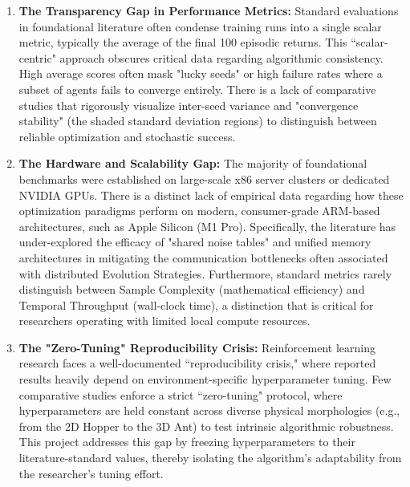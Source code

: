 \begin{enumerate}
    \item \textbf{The Transparency Gap in Performance Metrics:} Standard evaluations in foundational literature often condense training runs into a single scalar metric, typically the average of the final 100 episodic returns. This ``scalar-centric" approach obscures critical data regarding algorithmic consistency. High average scores often mask "lucky seeds" or high failure rates where a subset of agents fails to converge entirely. There is a lack of comparative studies that rigorously visualize inter-seed variance and "convergence stability" (the shaded standard deviation regions) to distinguish between reliable optimization and stochastic success.
    
    \item \textbf{The Hardware and Scalability Gap:} The majority of foundational benchmarks were established on large-scale x86 server clusters or dedicated NVIDIA GPUs. There is a distinct lack of empirical data regarding how these optimization paradigms perform on modern, consumer-grade ARM-based architectures, such as Apple Silicon (M1 Pro). Specifically, the literature has under-explored the efficacy of "shared noise tables" and unified memory architectures in mitigating the communication bottlenecks often associated with distributed Evolution Strategies. Furthermore, standard metrics rarely distinguish between Sample Complexity (mathematical efficiency) and Temporal Throughput (wall-clock time), a distinction that is critical for researchers operating with limited local compute resources.
    
    \item \textbf{The "Zero-Tuning" Reproducibility Crisis:} Reinforcement learning research faces a well-documented ``reproducibility crisis," where reported results heavily depend on environment-specific hyperparameter tuning. Few comparative studies enforce a strict ``zero-tuning" protocol, where hyperparameters are held constant across diverse physical morphologies (e.g., from the 2D Hopper to the 3D Ant) to test intrinsic algorithmic robustness. This project addresses this gap by freezing hyperparameters to their literature-standard values, thereby isolating the algorithm's adaptability from the researcher's tuning effort.
    

\end{enumerate}
